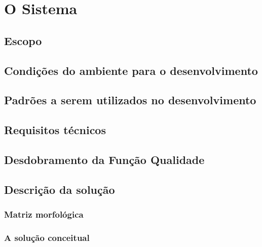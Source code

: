 \chapter{O Sistema}
\label{chap:sist}


\section{Escopo}
\label{sec:escopo}
\lipsum[1]


\section{Condições do ambiente para o desenvolvimento}
\label{sec:cond}
\lipsum[1]

\section{Padrões a serem utilizados no desenvolvimento}
\label{sec:pad}
\lipsum[1]


\section{Requisitos técnicos}
\label{sec:req-tec}
\lipsum[1]


\section{Desdobramento da Função Qualidade}
\label{sec:qfd}
\lipsum[1]


\section{Descrição da solução}
\label{sec:soluc}
\lipsum[1]


\subsection{Matriz morfológica}
\label{sec:matriz-morfo}
\lipsum[1]


\subsection{A solução conceitual}
\label{sec:conceito}
\lipsum[1]


